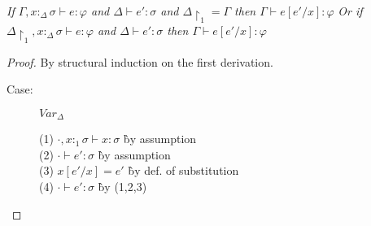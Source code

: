 
\begin{lemma}
\emph{If $\Gamma, x{:}_\Delta\sigma \vdash e : \varphi$ and $\Delta \vdash e' : \sigma$ and $\Delta\!\upharpoonright_1 = \Gamma$ then $\Gamma \vdash e[e'/x] : \varphi$}
\emph{Or if $\Delta\!\upharpoonright_1, x{:}_\Delta\sigma \vdash e : \varphi$ and $\Delta \vdash e' : \sigma$ then $\Gamma \vdash e[e'/x] : \varphi$}
\end{lemma}
\begin{proof}
By structural induction on the first derivation.

\begin{description}

\item[Case:] $Var_\Delta$
\begin{tabbing}
  (1) $\cdot,x{:}_1\sigma \vdash x : \sigma$ \` by assumption\\
  (2) $\cdot \vdash e' : \sigma$ \` by assumption\\
  (3) $x[e'/x] = e'$ \` by def. of substitution\\
  (4) $\cdot \vdash e' : \sigma$ \` by (1,2,3)\\
\end{tabbing}

\end{description}

\end{proof}

